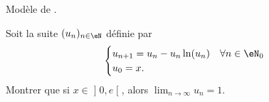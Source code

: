 
\begin{exercice}\label{exoTD3-0013}

    Modèle de .

    Soit la suite $(u_n)_{n\in\eN}$ définie par
    \begin{equation}
        \begin{cases}
            u_{n+1}=u_n-u_n\ln(u_n) &   \forall n\in\eN_0\\
            u_0=x.
        \end{cases}
    \end{equation}
    Montrer que si $x\in\mathopen] 0 , e \mathclose[$, alors $\lim_{n\to\infty}u_n=1$.

\end{exercice}
